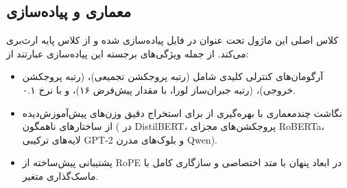 \subsection{معماری و پیاده‌سازی}
کلاس اصلی این ماژول تحت عنوان  در فایل  پیاده‌سازی شده و از کلاس پایه  ارث‌بری می‌کند. از جمله ویژگی‌های برجسته این پیاده‌سازی عبارتند از:
\begin{itemize}
    \item آرگومان‌های کنترلی کلیدی شامل  (رتبه پروجکشن تجمیعی)،  (رتبه پروجکشن خروجی)،  (رتبه جبران‌ساز لورا، با مقدار پیش‌فرض ۱۶)، و  با نرخ ۰.۱.
    \item نگاشت چندمعماری با بهره‌گیری از  برای استخراج دقیق وزن‌های پیش‌آموزش‌دیده از ساختارهای ناهمگون ( در DistilBERT، پروجکشن‌های مجزای RoBERTa، لایه‌های  ترکیبی GPT-2 و بلوک‌های مدرن Qwen).
    \item پشتیبانی پیش‌ساخته از RoPE در ابعاد پنهان با متد اختصاصی  و سازگاری کامل با ماسک‌گذاری متغیر.
\end{itemize}
